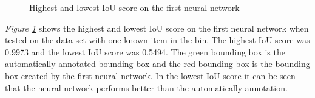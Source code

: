\begin{figure}[h]
    \centering
    \hspace{0.5cm}
    \caption{Highest and lowest IoU score on the first neural network}
    \label{figure: v1bestworst}
\end{figure}
\textit{Figure \ref{figure: v1bestworst}} shows the highest and lowest IoU score on the first neural network when tested on the data set with one known item in the bin. The highest IoU score was 0.9973 and the lowest IoU score was 0.5494. The green bounding box is the automatically annotated bounding box and the red bounding box is the bounding box created by the first neural network. In the lowest IoU score it can be seen that the neural network performs better than the automatically annotation.

\clearpage
